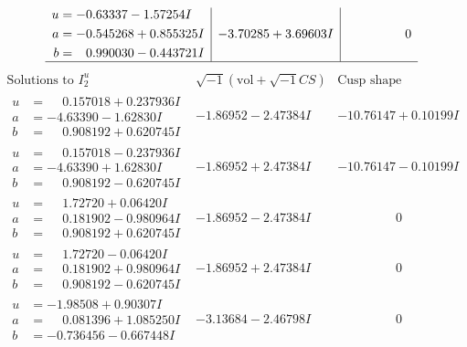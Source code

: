 \documentclass[1p]{elsarticle_modified}
\theoremstyle{definition}
\newcommand{\I}{\sqrt{-1}}
\begin{document}
$$\begin{array}{c|c|c}
\begin{aligned}
u &= -0.63337 - 1.57254 I \\
a &= -0.545268 + 0.855325 I \\
b &= \phantom{-}0.990030 - 0.443721 I\end{aligned}
 & -3.70285 + 3.69603 I & \phantom{-0.000000 } 0\\
 \hline 
 \end{array}$$\newpage$$\begin{array}{c|c|c}  
\text{Solutions to }I^u_{2}& \I (\text{vol} + \sqrt{-1}CS) & \text{Cusp shape}\\
 \hline 
\begin{aligned}
u &= \phantom{-}0.157018 + 0.237936 I \\
a &= -4.63390 - 1.62830 I \\
b &= \phantom{-}0.908192 + 0.620745 I\end{aligned}
 & -1.86952 - 2.47384 I & -10.76147 + 0.10199 I \\ \hline\begin{aligned}
u &= \phantom{-}0.157018 - 0.237936 I \\
a &= -4.63390 + 1.62830 I \\
b &= \phantom{-}0.908192 - 0.620745 I\end{aligned}
 & -1.86952 + 2.47384 I & -10.76147 - 0.10199 I \\ \hline\begin{aligned}
u &= \phantom{-}1.72720 + 0.06420 I \\
a &= \phantom{-}0.181902 - 0.980964 I \\
b &= \phantom{-}0.908192 + 0.620745 I\end{aligned}
 & -1.86952 - 2.47384 I & \phantom{-0.000000 } 0 \\ \hline\begin{aligned}
u &= \phantom{-}1.72720 - 0.06420 I \\
a &= \phantom{-}0.181902 + 0.980964 I \\
b &= \phantom{-}0.908192 - 0.620745 I\end{aligned}
 & -1.86952 + 2.47384 I & \phantom{-0.000000 } 0 \\ \hline\begin{aligned}
u &= -1.98508 + 0.90307 I \\
a &= \phantom{-}0.081396 + 1.085250 I \\
b &= -0.736456 - 0.667448 I\end{aligned}
 & -3.13684 - 2.46798 I & \phantom{-0.000000 } 0 \\ \hline\begin{aligned}

\end{aligned}
\end{array}$$
\end{document}
